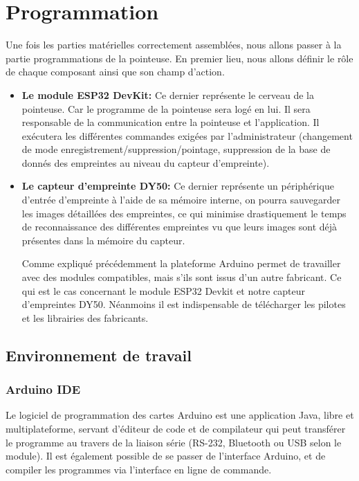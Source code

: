     
\section{Programmation}
Une fois les parties matérielles correctement assemblées, nous allons passer à la partie programmations de la pointeuse. En premier lieu, nous allons définir le rôle de chaque composant ainsi que son champ d’action.
\begin{itemize}

    \item[\textbullet] \textbf{Le module ESP32 DevKit:} Ce dernier représente le cerveau de la pointeuse. Car le programme de la pointeuse sera logé en lui. Il sera responsable de la communication entre la pointeuse et l’application. Il exécutera les différentes commandes exigées par l’administrateur (changement de mode enregistrement/suppression/pointage, suppression de la base de donnés des empreintes au niveau du capteur d’empreinte).  
    
    \item[\textbullet] \textbf{Le capteur d'empreinte DY50:} Ce dernier représente un périphérique d’entrée d’empreinte à l’aide de sa mémoire interne, on pourra sauvegarder les images détaillées des empreintes, ce qui minimise drastiquement le temps de reconnaissance des différentes empreintes vu que leurs images sont déjà présentes dans la mémoire du capteur.
        
    Comme expliqué précédemment la plateforme Arduino permet de travailler avec des modules compatibles, mais s’ils sont issus d’un autre fabricant. Ce qui est le cas concernant le module ESP32 Devkit et notre capteur d’empreintes DY50. Néanmoins il est indispensable de télécharger les pilotes et les librairies des fabricants.    
\end{itemize}
    \subsection{Environnement de travail}
        
            \subsubsection{Arduino IDE }
                Le logiciel de programmation des cartes Arduino est une application Java, libre et multiplateforme, servant d'éditeur de code et de compilateur qui peut transférer le programme au travers de la liaison série (RS-232, Bluetooth ou USB selon le module). Il est également possible de se passer de l'interface Arduino, et de compiler les programmes via l'interface en ligne de commande.
                
